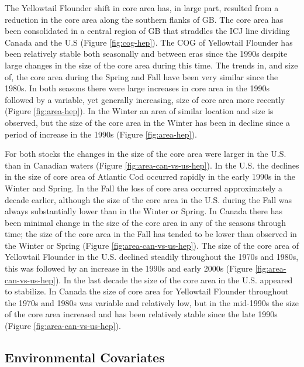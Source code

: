 \documentclass[
]{article}
\begin{document}
The Yellowtail Flounder shift in core area has, in large part, resulted from a reduction in the core area along the southern flanks of GB. The core area has been consolidated in a central region of GB that straddles the ICJ line dividing Canada and the U.S (Figure \ref{fig:cog-hep}). The COG of Yellowtail Flounder has been relatively stable both seasonally and between eras since the 1990s despite large changes in the size of the core area during this time. The trends in, and size of, the core area during the Spring and Fall have been very similar since the 1980s. In both seasons there were large increases in core area in the 1990s followed by a variable, yet generally increasing, size of core area more recently (Figure \ref{fig:area-hep}). In the Winter an area of similar location and size is observed, but the size of the core area in the Winter has been in decline since a period of increase in the 1990s (Figure \ref{fig:area-hep}).

For both stocks the changes in the size of the core area were larger in the U.S. than in Canadian waters (Figure \ref{fig:area-can-vs-us-hep}). In the U.S. the declines in the size of core area of Atlantic Cod occurred rapidly in the early 1990s in the Winter and Spring. In the Fall the loss of core area occurred approximately a decade earlier, although the size of the core area in the U.S. during the Fall was always substantially lower than in the Winter or Spring. In Canada there has been minimal change in the size of the core area in any of the seasons through time; the size of the core area in the Fall has tended to be lower than observed in the Winter or Spring (Figure \ref{fig:area-can-vs-us-hep}). The size of the core area of Yellowtail Flounder in the U.S. declined steadily throughout the 1970s and 1980s, this was followed by an increase in the 1990s and early 2000s (Figure \ref{fig:area-can-vs-us-hep}). In the last decade the size of the core area in the U.S. appeared to stabilize. In Canada the size of core area for Yellowtail Flounder throughout the 1970s and 1980s was variable and relatively low, but in the mid-1990s the size of the core area increased and has been relatively stable since the late 1990s (Figure \ref{fig:area-can-vs-us-hep}).

\hypertarget{environmental-covariates-1}{%
\subsection{Environmental Covariates}\label{environmental-covariates-1}}
\end{document}
